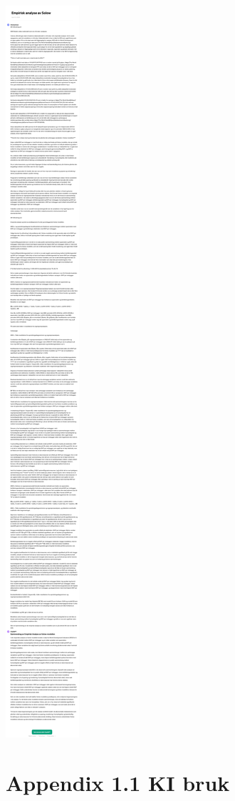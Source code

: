 \documentclass[
  12pt,
  a4paper,
  DIV=11,
  numbers=noendperiod]{scrartcl}
\begin{document}
\includegraphics{dokumentobjekter/figurer/chatgpt_sammendrag.png}

\clearpage

\section {Appendix 1.1 KI bruk}
\end{document}
